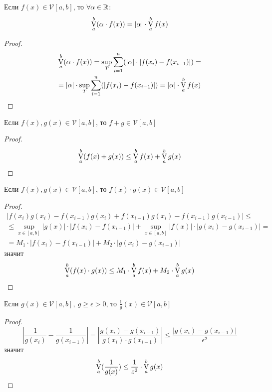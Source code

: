 \begin{numtheorem}
    Если $f(x)\in \mathcal{V} [a,b]$, то $\forall \alpha\in \mathbb{R}$:
    \[\operatorname*{V}\limits_{a}^{b}(\alpha\cdot f(x))=|\alpha|\cdot \operatorname*{V}\limits_{a}^{b} f(x)\] 
\end{numtheorem} 
\begin{proof}
    \begin{multline*}
        \operatorname*{V}\limits_{a}^{b}(\alpha\cdot f(x))=\sup\limits_T \sum\limits_{i=1}^{n}(|\alpha|\cdot|f(x_i)-f(x_{i-1})|)=\\
        =|\alpha|\cdot \sup\limits_T \sum\limits_{i=1}^{n}(|f(x_i)-f(x_{i-1})|)=|\alpha|\cdot \operatorname*{V}\limits_{a}^{b}f(x)
    \end{multline*} 
\end{proof} 
\begin{numtheorem}
    Если $f(x),g(x)\in \mathcal{V}[a,b]$, то $f+g\in \mathcal{V}[a,b]$
\end{numtheorem} 
\begin{proof}
    \[\operatorname*{V}\limits_{a}^{b} (f(x)+g(x))\leq \operatorname*{V}\limits_{a}^{b} f(x)+\operatorname*{V}\limits_{a}^{b} g(x)\]
\end{proof} 
\begin{numtheorem}
    Если $f(x),g(x)\in \mathcal{V}[a,b]$, то $f(x)\cdot g(x)\in \mathcal{V}[a,b]$
\end{numtheorem} 
\begin{proof}
    \begin{multline*}
        |f(x_i)g(x_i)-f(x_{i-1})g(x_i)+f(x_{i-1})g(x_{i})-f(x_{i-1})g(x_{i-1})|\leq\\
        \leq \sup\limits_{x\in [a,b]}|g(x)|\cdot |f(x_i)-f(x_{i-1})|+\sup\limits_{x\in [a,b]}|f(x)|\cdot |g(x_i)-g(x_{i-1})|=\\
        =M_1\cdot |f(x_i)-f(x_{i-1})|+M_2\cdot |g(x_i)-g(x_{i-1})|
    \end{multline*}
    значит
    \[\operatorname*{V}\limits_{a}^{b}(f(x)\cdot g(x))\leq M_1\cdot \operatorname*{V}\limits_{a}^{b}f(x)+M_2\cdot \operatorname*{V}\limits_{a}^{b}g(x)\]
\end{proof} 
\begin{numtheorem}
    Если $g(x)\in \mathcal{V}[a,b],\ g\geq \epsilon>0$, то $\frac{1}{g}(x)\in \mathcal{V}[a,b]$
\end{numtheorem} 
\begin{proof}
    \[\left|\frac{1}{g(x_i)}-\frac{1}{g(x_{i-1})}\right|=\left|\frac{g(x_i)-g(x_{i-1})}{g(x_i)\cdot g(x_{i-1})}\right|\leq \frac{|g(x_i)- g(x_{i-1})|}{\epsilon^2}\]
    значит
    \[\operatorname*{V}\limits_{a}^{b}(\frac{1}{g(x)})\leq \frac{1}{\varepsilon^2}\cdot \operatorname*{V}\limits_{a}^{b}g(x)\]
\end{proof} 
